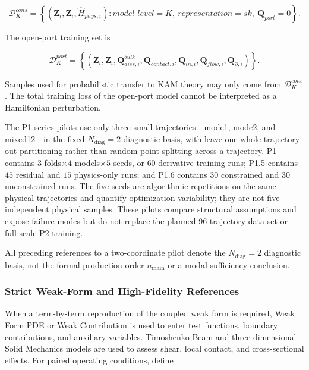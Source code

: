 \begin{equation}
\label{eq:chnn-4-20}
\mathcal{D}_{K}^{cons} = \left\{ \left( \mathbf{Z}_{i},{\dot{\mathbf{Z}}}_{i},{\widehat{H}}_{phys,i} \right):model\_ level = K,\ representation = sk,\ \mathbf{Q}_{port} = 0 \right\}.
\end{equation}

The open-port training set is

\begin{equation}
\label{eq:chnn-4-21}
\mathcal{D}_{K}^{port} = \left\{ \left( \mathbf{Z}_{i},{\dot{\mathbf{Z}}}_{i},\mathbf{Q}_{diss,i}^{bulk},\mathbf{Q}_{contact,i},\mathbf{Q}_{in,i},\mathbf{Q}_{flow,i},\mathbf{Q}_{\partial,i} \right) \right\}.
\end{equation}

Samples used for probabilistic transfer to KAM theory may only come from \(\mathcal{D}_{K}^{cons}\). The total training loss of the open-port model cannot be interpreted as a Hamiltonian perturbation.

The P1-series pilots use only three small trajectories---mode1, mode2, and mixed12---in the fixed \(N_{\mathrm{diag}}=2\) diagnostic basis, with leave-one-whole-trajectory-out partitioning rather than random point splitting across a trajectory. P1 contains \(3\) folds\(\times4\) models\(\times5\) seeds, or \(60\) derivative-training runs; P1.5 contains \(45\) residual and \(15\) physics-only runs; and P1.6 contains \(30\) constrained and \(30\) unconstrained runs. The five seeds are algorithmic repetitions on the same physical trajectories and quantify optimization variability; they are not five independent physical samples. These pilots compare structural assumptions and expose failure modes but do not replace the planned 96-trajectory data set or full-scale P2 training.

All preceding references to a two-coordinate pilot denote the \(N_{\mathrm{diag}}=2\) diagnostic basis, not the formal production order \(n_{\mathrm{main}}\) or a modal-sufficiency conclusion.

\subsubsection{Strict Weak-Form and High-Fidelity References}\label{sec:chnn-4-4-2}

When a term-by-term reproduction of the coupled weak form is required, Weak Form PDE or Weak Contribution is used to enter test functions, boundary contributions, and auxiliary variables.\cite{COMSOLWeakFormPDE2025,COMSOLWeakContribution2025} Timoshenko Beam and three-dimensional Solid Mechanics models are used to assess shear, local contact, and cross-sectional effects. For paired operating conditions, define

